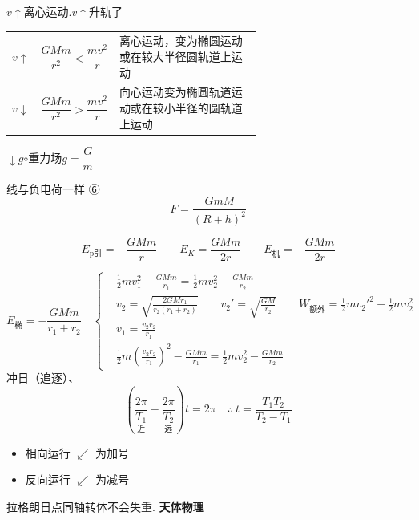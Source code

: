 $v\uparrow$\quad 离心运动.\quad $v\uparrow$\quad 升轨了

\begin{tabular}{@{}l@{\;}l@{\;\;}p{0.62\linewidth}@{}}
$v\uparrow$ & $\dfrac{GMm}{r^{2}}<\dfrac{mv^{2}}{r}$ & 离心运动，变为椭圆运动或在较大半径圆轨道上运动 \\[6pt] %
$v\downarrow$ & $\dfrac{GMm}{r^{2}}>\dfrac{mv^{2}}{r}$ & 向心运动\quad 变为椭圆轨道运动或在较小半径的圆轨道上运动 \\
\end{tabular}
$\downarrow g$\quad $\circ$\quad 重力场\qquad $g=\dfrac{G}{m}$

线与负电荷一样
⑥
\[ F=\frac{GmM}{(R+h)^2} \]
\begin{keybox}[天体功能]
\[ E_{\mathrm{p}\text{引}}=-\frac{GMm}{r}\qquad E_K=\frac{GMm}{2r}\qquad E_{\text{机}}=-\frac{GMm}{2r} \]
\end{keybox}

\[ E_{\text{椭}}=-\frac{GMm}{r_1+r_2}\quad
\left\{\begin{aligned}
& \frac{1}{2}mv_1^2-\frac{GMm}{r_1}=\frac{1}{2}mv_2^2-\frac{GMm}{r_2}\\
& v_2=\sqrt{\frac{2GMr_1}{r_2(r_1+r_2)}}\qquad v_2'=\sqrt{\frac{GM}{r_2}}\qquad W_{\text{额外}}=\frac{1}{2}mv_2'^2-\frac{1}{2}mv_2^2\\
& v_1=\frac{v_2 r_2}{r_1}\\
& \frac{1}{2}m\left(\frac{v_2 r_2}{r_1}\right)^2-\frac{GMm}{r_1}=\frac{1}{2}mv_2^2-\frac{GMm}{r_2}
\end{aligned}\right. \]
冲日（追逐）、
\[ \left(\underset{\text{近}}{\frac{2\pi}{T_1}}-\underset{\text{远}}{\frac{2\pi}{T_2}}\right)t=2\pi\quad\therefore\ t=\frac{T_1T_2}{T_2-T_1} \]

\begin{itemize}
\item 相向运行 $\swarrow$ 为加号 %
\item 反向运行 $\swarrow$ 为减号 %
\end{itemize}
拉格朗日点\quad 同轴转体\quad 不会失重\quad {}.
\textbf{天体物理}

